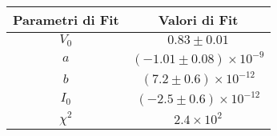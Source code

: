 \begin{tabular}{cc}
\hline
	Parametri di Fit & Valori di Fit\\ 
\hline
	$V_0$ & $0.83\pm0.01$ \\
	$a$ & $(-1.01\pm0.08)\times 10^{-9}$ \\
	$b$ & $(7.2\pm0.6)\times 10^{-12}$ \\
	$I_0$ & $(-2.5\pm0.6)\times 10^{-12}$ \\
	$\chi^2$ & $2.4\times 10^{2}$ \\
\hline
\end{tabular}
